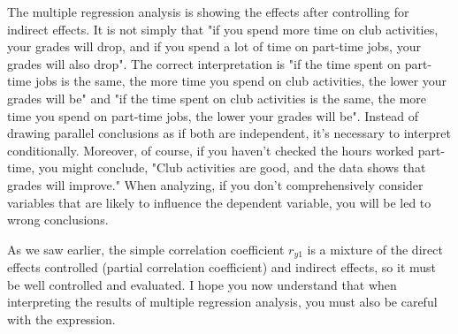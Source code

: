 \documentclass{ltjbook}
\begin{document}
The multiple regression analysis is showing the effects after controlling for indirect effects. It is not simply that "if you spend more time on club activities, your grades will drop, and if you spend a lot of time on part-time jobs, your grades will also drop". The correct interpretation is "if the time spent on part-time jobs is the same, the more time you spend on club activities, the lower your grades will be" and "if the time spent on club activities is the same, the more time you spend on part-time jobs, the lower your grades will be". Instead of drawing parallel conclusions as if both are independent, it's necessary to interpret conditionally.
Moreover, of course, if you haven't checked the hours worked part-time, you might conclude, "Club activities are good, and the data shows that grades will improve." When analyzing, if you don't comprehensively consider variables that are likely to influence the dependent variable, you will be led to wrong conclusions.

As we saw earlier, the simple correlation coefficient $r_{y1}$ is a mixture of the direct effects controlled (partial correlation coefficient) and indirect effects, so it must be well controlled and evaluated. I hope you now understand that when interpreting the results of multiple regression analysis, you must also be careful with the expression.
\end{document}
